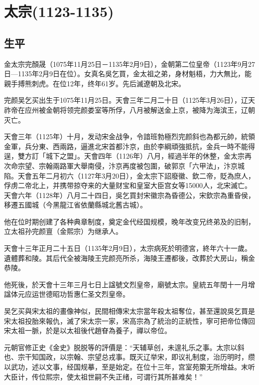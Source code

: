 
\section{太宗\tiny(1123-1135)}

\subsection{生平}

金太宗完顏晟（1075年11月25日－1135年2月9日），金朝第二位皇帝（1123年9月27日—1135年2月9日在位）。女真名吳乞買，金太祖之弟，身材魁梧，力大無比，能親手搏熊刺虎。在位12年，终年61岁。先后滅遼朝及北宋。

完颜吴乞买出生于1075年11月25日。天會三年二月二十日（1125年3月26日），辽天祚帝在应州被金朝将领完颜娄室等所俘，八月被解送金上京，被降为海滨王，辽朝灭亡。

天會三年（1125年）十月，发动宋金战争，令諳班勃極烈完颜斜也為都元帥，統領金軍，兵分東、西兩路，逼進北宋首都汴京，由於李綱頑強抵抗，金兵一時不能得逞，雙方訂「城下之盟」。天會四年（1126年）八月，經過半年的休整，金太宗再次命宗望、宗翰兩路軍大舉南侵，汴京再度被包圍，破郭京「六甲法」，汴京城陷。天會五年二月初六（1127年3月20日），金太宗下詔廢徽、欽二帝，貶為庶人，俘虏二帝北上，并携带掠夺来的大量财宝和皇室大臣宫女等15000人，北宋滅亡。天會六年（1128年）八月二十四日，吳乞買封宋徽宗為昏德公，宋欽宗為重昏侯，移遷五國城（今黑龍江省依蘭縣城北舊古城）。

他在位时期创建了各种典章制度，奠定金代经国规模，晚年改变兄终弟及的旧制，立太祖孙完颜亶（金熙宗）为继承人。

天會十三年正月二十五日（1135年2月9日），太宗病死於明德宮，終年六十一歲。遺體葬和陵。其后代全被海陵王完颜亮所杀，海陵王遷都後，改葬於大房山，稱金恭陵。

他死後，於天會十三年三月七日上諡號文烈皇帝，廟號太宗。皇統五年閏十一月增諡体元应运世德昭功哲惠仁圣文烈皇帝。

吴乞买與宋太祖的畫像神似，民間相傳宋太宗當年殺太祖奪位，甚至還說吳乞買是宋太祖投胎來報仇，滅了宋太宗一家，宋高宗為了統治的正統性，寧可把帝位傳回宋太祖一脈，於是以太祖後代趙眘為養子，禪以帝位。

元朝官修正史《金史》脱脱等的評價是：“天辅草创，未遑礼乐之事。太宗以斜也、宗干知国政，以宗翰、宗望总戎事。既灭辽举宋，即议礼制度，治历明时，缵以武功，述以文事，经国规摹，至是始定。在位十三年，宫室苑籞无所增益。末听大臣计，传位熙宗，使太祖世嗣不失正绪，可谓行其所甚难矣！”

